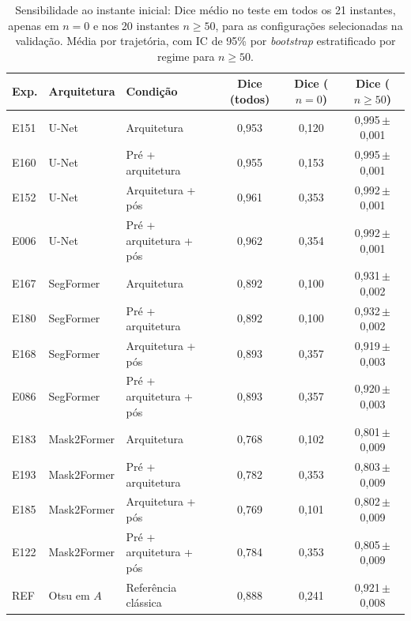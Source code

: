 \begin{table}[htbp]
\centering
\caption{Sensibilidade ao instante inicial: Dice médio no teste em todos os 21 instantes, apenas em $n=0$ e nos 20 instantes $n\geq50$, para as configurações selecionadas na validação. Média por trajetória, com IC de 95\% por \textit{bootstrap} estratificado por regime para $n\geq50$.}
\label{tab:sensibilidade}
\footnotesize\setlength{\tabcolsep}{3pt}
\begin{sbcfitwidth}
\begin{tabular}{lllccc}
\toprule
Exp. & Arquitetura & Condição & Dice (todos) & Dice ($n=0$) & Dice ($n\geq50$) \\
\midrule
E151 & U-Net & Arquitetura & 0{,}953 & 0{,}120 & 0{,}995\,{\scriptsize$\pm$0{,}001} \\
E160 & U-Net & Pré + arquitetura & 0{,}955 & 0{,}153 & 0{,}995\,{\scriptsize$\pm$0{,}001} \\
E152 & U-Net & Arquitetura + pós & 0{,}961 & 0{,}353 & 0{,}992\,{\scriptsize$\pm$0{,}001} \\
E006 & U-Net & Pré + arquitetura + pós & 0{,}962 & 0{,}354 & 0{,}992\,{\scriptsize$\pm$0{,}001} \\
\midrule
E167 & SegFormer & Arquitetura & 0{,}892 & 0{,}100 & 0{,}931\,{\scriptsize$\pm$0{,}002} \\
E180 & SegFormer & Pré + arquitetura & 0{,}892 & 0{,}100 & 0{,}932\,{\scriptsize$\pm$0{,}002} \\
E168 & SegFormer & Arquitetura + pós & 0{,}893 & 0{,}357 & 0{,}919\,{\scriptsize$\pm$0{,}003} \\
E086 & SegFormer & Pré + arquitetura + pós & 0{,}893 & 0{,}357 & 0{,}920\,{\scriptsize$\pm$0{,}003} \\
\midrule
E183 & Mask2Former & Arquitetura & 0{,}768 & 0{,}102 & 0{,}801\,{\scriptsize$\pm$0{,}009} \\
E193 & Mask2Former & Pré + arquitetura & 0{,}782 & 0{,}353 & 0{,}803\,{\scriptsize$\pm$0{,}009} \\
E185 & Mask2Former & Arquitetura + pós & 0{,}769 & 0{,}101 & 0{,}802\,{\scriptsize$\pm$0{,}009} \\
E122 & Mask2Former & Pré + arquitetura + pós & 0{,}784 & 0{,}353 & 0{,}805\,{\scriptsize$\pm$0{,}009} \\
\midrule
REF & Otsu em $A$ & Referência clássica & 0{,}888 & 0{,}241 & 0{,}921\,{\scriptsize$\pm$0{,}008} \\
\bottomrule
\end{tabular}
\end{sbcfitwidth}
\end{table}
